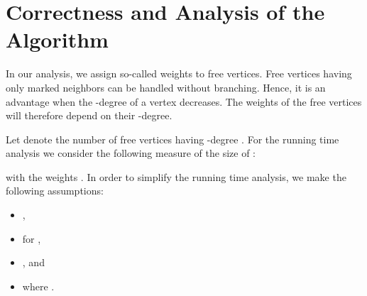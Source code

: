 \documentclass[a4paper,10pt]{article}
\theoremstyle{plain}
\theoremstyle{definition}
\theoremstyle{remark}
\begin{document}
\section{Correctness and Analysis of the Algorithm}
\label{sec:correctanaly}

In our analysis, we assign so-called weights to free vertices.
{F}ree vertices having only marked neighbors can be handled without
branching. Hence, it is an advantage when the -degree of a vertex decreases.
The weights of the free vertices will therefore depend on their
-degree.

Let  denote the number of free vertices having -degree .
For the running time analysis we consider the following measure of the size of :

with the weights .
In order to simplify the running time analysis, we make the following assumptions:

\begin{itemize}
\item ,
\item  for ,
\item , and
\item  where .
\end{itemize}
\end{document}
